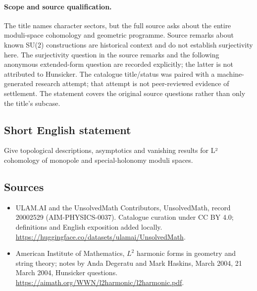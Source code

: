 \documentclass[11pt]{article}
\begin{document}
\paragraph{Scope and source qualification.}The title names character sectors, but the full source asks about the entire moduli-space cohomology and geometric programme. Source remarks about known SU(2) constructions are historical context and do not establish surjectivity here. The surjectivity question in the source remarks and the following anonymous extended-form question are recorded explicitly; the latter is not attributed to Hunsicker. The catalogue title/status was paired with a machine-generated research attempt; that attempt is not peer-reviewed evidence of settlement. The statement covers the original source questions rather than only the title’s subcase.
\subsection{Short English statement}
Give topological descriptions, asymptotics and vanishing results for L² cohomology of monopole and special-holonomy moduli spaces.
\subsection{Sources}
\begin{itemize}
\item[\hypertarget{source:20002529:1}{S1}] ULAM.AI and the UnsolvedMath Contributors, UnsolvedMath, record 20002529 (AIM-PHYSICS-0037). Catalogue curation under CC BY 4.0; definitions and English exposition added locally.
\url{https://huggingface.co/datasets/ulamai/UnsolvedMath}.
\item[\hypertarget{source:20002529:2}{S2}] American Institute of Mathematics, $L^2$ harmonic forms in geometry and string theory; notes by Anda Degeratu and Mark Haskins, March 2004, 21 March 2004, Hunsicker questions.
\url{https://aimath.org/WWN/l2harmonic/l2harmonic.pdf}.
\end{itemize}
\label{end:20002529}
\end{document}
